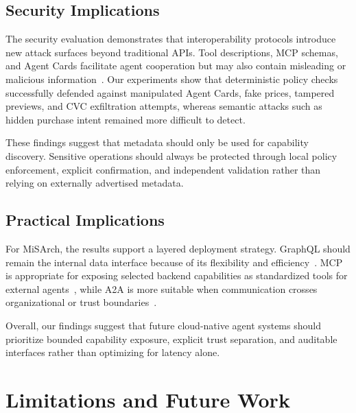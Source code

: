 \documentclass[conference]{IEEEtran}
\begin{document}
\subsection{Security Implications}

The security evaluation demonstrates that interoperability protocols
introduce new attack surfaces beyond traditional APIs. Tool descriptions, MCP
schemas, and Agent Cards facilitate agent cooperation but may also contain
misleading or malicious information~\cite{ref2,ref6}. Our experiments show
that deterministic policy checks successfully defended against manipulated
Agent Cards, fake prices, tampered previews, and CVC exfiltration attempts,
whereas semantic attacks such as hidden purchase intent remained more
difficult to detect.

These findings suggest that metadata should only be used for capability
discovery. Sensitive operations should always be protected through local
policy enforcement, explicit confirmation, and independent validation rather
than relying on externally advertised metadata.

\subsection{Practical Implications}

For MiSArch, the results support a layered deployment strategy. GraphQL
should remain the internal data interface because of its flexibility and
efficiency~\cite{ref9}. MCP is appropriate for exposing selected backend
capabilities as standardized tools for external agents~\cite{ref2}, while A2A
is more suitable when communication crosses organizational or trust
boundaries~\cite{ref3}.

Overall, our findings suggest that future cloud-native agent systems should
prioritize bounded capability exposure, explicit trust separation, and
auditable interfaces rather than optimizing for latency alone.

\section{Limitations and Future Work}
\label{sec:limitations}
\end{document}
